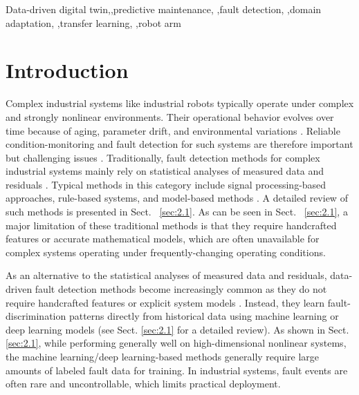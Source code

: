 \documentclass[a4paper,10pt]{cas-sc}%
\begin{document}
\begin{keywords}
	Data-driven digital twin,\sep predictive maintenance, \sep fault detection, \sep domain adaptation, \sep transfer learning, \sep robot arm
\end{keywords}

\maketitle

%
%
\section{Introduction}

Complex industrial systems like industrial robots typically operate under complex and strongly nonlinear environments. Their operational behavior evolves over time because of aging, parameter drift, and environmental variations \citep{QIAO201851, lei2025condition}. Reliable condition-monitoring and fault detection for such systems are therefore important but challenging issues \citep{SABRY2024102397}. Traditionally, fault detection methods for complex industrial systems mainly rely on statistical analyses of measured data and residuals \citep{SABRY2024102397}. Typical methods in this category include signal processing-based approaches, rule-based systems, and model-based methods \citep{SABRY2024102397, 9529495}. A detailed review of such methods is presented in Sect. ~\ref{sec:2.1}. As can be seen in Sect. ~\ref{sec:2.1}, a major limitation of these traditional methods is that they require handcrafted features or accurate mathematical models, which are often unavailable for complex systems operating under frequently-changing operating conditions.

As an alternative to the statistical analyses of measured data and residuals, data-driven fault detection methods become increasingly common as they do not require handcrafted features or explicit system models \citep{SABRY2024102397, 9529495}. Instead, they learn fault-discrimination patterns directly from historical data using machine learning or deep learning models \citep{SABRY2024102397, 9529495} (see Sect. \ref{sec:2.1} for a detailed review). As shown in Sect. \ref{sec:2.1}, while performing generally well on high-dimensional nonlinear systems, the machine learning/deep learning-based methods generally require large amounts of labeled fault data for training. In industrial systems, fault events are often rare and uncontrollable, which limits practical deployment.
\end{document}
